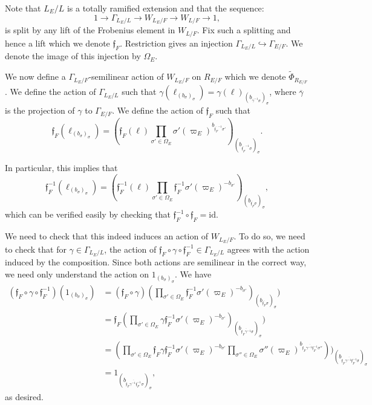 \documentclass[11pt]{amsart}
\theoremstyle{definition}
\newcommand{\ov}{\overline}
\newcommand{\mf}{\mathfrak}
\begin{document}
Note that $L_E/L$ is a totally ramified extension and that the sequence:
\begin{equation*}
    1 \to \Gamma_{L_E/L} \to W_{L_E/F} \to W_{L/F} \to 1,
\end{equation*}
is split by any lift of the Frobenius element in $W_{L/F}$. Fix such a splitting and hence a lift which we denote $\mf{f}_F$. Restriction gives an injection $\Gamma_{L_E/L} \hookrightarrow \Gamma_{E/F}$. We denote the image of this injection by $\Omega_E$.

We now define a $\Gamma_{L_E/F}$-semilinear action of $W_{L_E/F}$ on $R_{E/F}$ which we denote $\widetilde{\Phi}_{R_{E/F}}$. We define the action of $\Gamma_{L_E/L}$ such that $\gamma(\ell_{(b_{\sigma})_{\sigma}}) = \gamma(\ell)_{(b_{\ov{\gamma}^{-1}\sigma})_{\sigma}}$, where $\ov{\gamma}$ is the projection of $\gamma$ to $\Gamma_{E/F}$. We define the action of $\mf{f}_F$ such that
\begin{equation*}
\mf{f}_F(\ell_{(b_{\sigma})_{\sigma}}) = ({\mf{f}_F(\ell)\prod\limits_{\sigma' \in \Omega_E} \sigma'(\varpi_E)^{b_{\ov{\mf{f}_F}^{-1}\sigma'}}})_{(b_{\ov{\mf{f}_F}^{-1}\sigma})_{\sigma}}.
\end{equation*}

In particular, this implies that 
\begin{equation*}
\mf{f}_F^{-1}(\ell_{(b_{\sigma})_{\sigma}}) = ({\mf{f}_F^{-1}(\ell)\prod\limits_{\sigma' \in \Omega_E} \mf{f}_{F}^{-1}\sigma'(\varpi_E)^{-b_{\sigma'}}})_{(b_{\ov{\mf{f}_F}\sigma})_{\sigma}},
\end{equation*}
which can be verified easily by checking that $\mf{f}_{F}^{-1} \circ \mf{f}_{F} = \text{id}$.

We need to check that this indeed induces an action of $W_{L_E/F}$. To do so, we need to check that for $\gamma \in \Gamma_{L_E/L}$, the action of $\mf{f}_F \circ \gamma \circ \mf{f}^{-1}_F \in \Gamma_{L_E/L}$ agrees with the action induced by the composition. Since both actions are semilinear in the correct way, we need only understand the action on $1_{(b_{\sigma})_{\sigma}}$. We have 
\begin{align*}
    (\mf{f}_F \circ \gamma \circ \mf{f}^{-1}_F)(1_{(b_{\sigma})_{\sigma}})  & =  (\mf{f}_F \circ \gamma)(\prod\limits_{\sigma' \in \Omega_E} \mf{f}^{-1}_F\sigma'(\varpi_E)^{-b_{\sigma'}})_{(b_{\ov{\mf{f}_F} \sigma})_{\sigma}})\\
    &=\mf{f}_F(\prod\limits_{\sigma' \in \Omega_E} \gamma\mf{f}^{-1}_F\sigma'(\varpi_E)^{-b_{\sigma'}})_{(b_{\ov{\mf{f}_F \gamma^{-1}} \sigma})_{\sigma}})\\
    &=(\prod\limits_{\sigma' \in \Omega_E} \mf{f}_F\gamma\mf{f}^{-1}_F\sigma'(\varpi_E)^{-b_{\sigma'}} \prod\limits_{\sigma'' \in \Omega_E} \sigma''(\varpi_E)^{b_{\ov{\mf{f}_F \gamma^{-1}\mf{f}^{-1}_F}\sigma''}}))_{(b_{\ov{\mf{f}_F \gamma^{-1} \mf{f}^{-1}_F} \sigma})_{\sigma}}\\
    &=1_{(b_{\ov{\mf{f}_F\gamma^{-1}\mf{f}^{-1}_F}\sigma})_{\sigma}},
\end{align*}
as desired.
\end{document}
